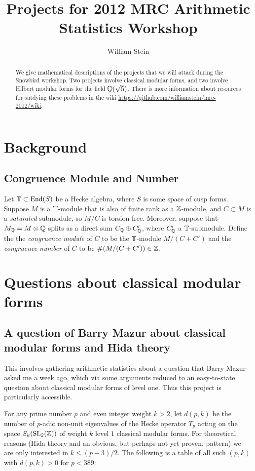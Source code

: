 \documentclass{article}
\title{Projects for 2012 MRC Arithmetic Statistics Workshop}
\author{William Stein}
\begin{document}
\maketitle
\begin{abstract}
  We give mathematical descriptions of the projects that we will
  attack during the Snowbird workshop.  Two projects involve classical
  modular forms, and two involve Hilbert modular forms for the field
  $\mathbb{Q}(\sqrt{5})$. There is more information about resources for
  sutdying these problems in the wiki
  \url{https://github.com/williamstein/mrc-2012/wiki}.
\end{abstract}

\tableofcontents

\section{Background}

\subsection{Congruence Module and Number}\label{sec:cong}
Let $\mathbb{T} \subset \operatorname{End}(S)$ be a Hecke algebra, where $S$ is some space
of cusp forms.  Suppose $M$ is a $\mathbb{T}$-module that is also of finite
rank as a $\mathbb{Z}$-module, and $C\subset M$ is a {\em saturated}
submodule, so $M/C$ is torsion free.  Moreover, suppose that $M_{\mathbb{Q}} =
M\otimes\mathbb{Q}$ splits as a direct sum $C_{\mathbb{Q}} \oplus C'_{\mathbb{Q}}$, where
$C'_{\mathbb{Q}}$ a $\mathbb{T}$-submodule.  Define the the {\em congruence module} of
$C$ to be the $\mathbb{T}$-module $M/(C+C')$ and the {\em congruence number}
of $C$ to be $\#(M/(C +C')) \in \mathbb{Z}$.  

\section{Questions about classical modular forms}

\subsection{A question of Barry Mazur about classical modular forms and Hida theory}

This involves gathering arithmetic statistics about a question that
Barry Mazur asked me a week ago, which via some arguments reduced to 
an easy-to-state question about classical modular forms of level one.
Thus this project is particularly accessible.

For any prime number $p$ and even integer weight $k>2$, let $d(p,k)$
be the number of $p$-adic non-unit eigenvalues of the Hecke operator
$T_p$ acting on the space $S_k(\operatorname{SL}_2(\mathbb{Z}))$ of weight $k$ level $1$
classical modular forms.  For theoretical reasons (Hida theory and an
obvious, but perhaps not yet proven, pattern) we are only interested
in $k\leq (p-3)/2$.  The following is a table of all such
$(p,k)$ with $d(p,k)>0$ for $p<389$:
\end{document}

